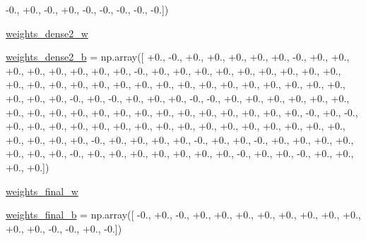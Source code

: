 \begin{DoxyCompactItemize}
-\/0., +0., -\/0., +0., -\/0., -\/0., -\/0., -\/0., -\/0.\mbox{]})
\item 
\hyperlink{namespacepybullet-gym_1_1pybulletgym_1_1tests_1_1roboschool_1_1agents_1_1_humanoid_py_bullet_env__v0__2017may_a5ad41f2285d87865e23de215c213d552}{weights\+\_\+dense2\+\_\+w}
\item 
\hyperlink{namespacepybullet-gym_1_1pybulletgym_1_1tests_1_1roboschool_1_1agents_1_1_humanoid_py_bullet_env__v0__2017may_a459bef2147c86909328d9b75c9b60b8b}{weights\+\_\+dense2\+\_\+b} = np.\+array(\mbox{[} +0., -\/0., +0., +0., +0., +0., +0., -\/0., +0., +0., +0., +0., +0., +0., +0., +0., -\/0., +0., +0., +0., +0., +0., +0., +0., +0., +0., +0., +0., +0., +0., +0., +0., +0., +0., +0., +0., +0., +0., +0., +0., +0., +0., +0., +0., +0., -\/0., +0., -\/0., +0., +0., +0., -\/0., -\/0., +0., +0., +0., +0., +0., +0., +0., +0., +0., +0., +0., +0., +0., +0., +0., +0., +0., +0., +0., +0., -\/0., +0., -\/0., +0., +0., +0., +0., +0., +0., +0., +0., +0., +0., +0., +0., +0., +0., +0., +0., +0., +0., +0., +0., -\/0., +0., +0., +0., +0., -\/0., +0., +0., -\/0., +0., +0., +0., +0., +0., +0., +0., -\/0., +0., +0., +0., +0., +0., +0., +0., -\/0., +0., +0., -\/0., +0., +0., +0., +0.\mbox{]})
\item 
\hyperlink{namespacepybullet-gym_1_1pybulletgym_1_1tests_1_1roboschool_1_1agents_1_1_humanoid_py_bullet_env__v0__2017may_a097804d3fde56a6d85ce65e6d8c20e27}{weights\+\_\+final\+\_\+w}
\item 
\hyperlink{namespacepybullet-gym_1_1pybulletgym_1_1tests_1_1roboschool_1_1agents_1_1_humanoid_py_bullet_env__v0__2017may_abb81de0f5c8f7ae7507c6bc9c958bbc8}{weights\+\_\+final\+\_\+b} = np.\+array(\mbox{[} -\/0., +0., -\/0., +0., +0., +0., +0., +0., +0., +0., +0., +0., +0., -\/0., -\/0., +0., -\/0.\mbox{]})
\end{DoxyCompactItemize}


